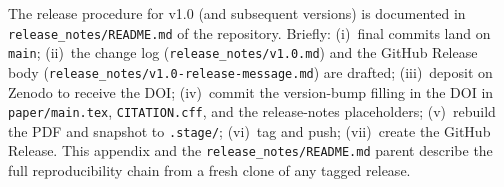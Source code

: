 The release procedure for v1.0 (and subsequent versions) is
documented in \nolinkurl{release_notes/README.md} of the
repository.  Briefly: (i)~final commits land on \texttt{main};
(ii)~the change log
(\nolinkurl{release_notes/v1.0.md}) and the GitHub Release body
(\nolinkurl{release_notes/v1.0-release-message.md}) are drafted;
(iii)~deposit on Zenodo to receive the DOI; (iv)~commit the
version-bump filling in the DOI in \nolinkurl{paper/main.tex},
\nolinkurl{CITATION.cff}, and the release-notes placeholders;
(v)~rebuild the PDF and snapshot to \nolinkurl{.stage/};
(vi)~tag and push; (vii)~create the GitHub Release.  This appendix
and the \nolinkurl{release_notes/README.md} parent describe the
full reproducibility chain from a fresh clone of any tagged
release.
